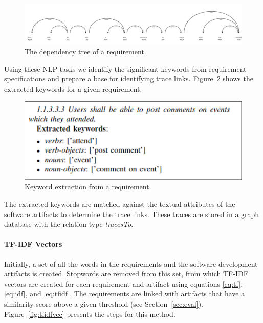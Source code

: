 \begin{figure}[htbp]
    \centering
    \includegraphics[width=1\linewidth]{figs/displacy.png}
    \caption{The dependency tree of a requirement.}
    \label{fig:deptree}
  \end{figure}

  Using these NLP tasks we identify the significant keywords from requirement specifications and prepare a base for identifying trace links. 
  Figure~\ref{fig:keywords} shows the extracted keywords for a given requirement.

  \begin{figure}[H]
    \centering
    \includegraphics[width=.96\linewidth]{figs/keywords.png}
    \caption{Keyword extraction from a requirement.}
    \label{fig:keywords}
  \end{figure}

  The extracted keywords are matched against the textual attributes of the software artifacts to determine the trace links.
  These traces are stored in a graph database with the relation type \emph{tracesTo}.

  \paragraph{TF-IDF Vectors} Initially, a set of all the words in the requirements and the software development artifacts is created. 
  Stopwords are removed from this set, from which
  TF-IDF vectors are created for each requirement and artifact using equations \ref{eq:tf}, \ref{eq:idf}, and \ref{eq:tfidf}. 
  The requirements are linked with artifacts that have a similarity score above a given threshold (see Section~\ref{sec:eval}).
  Figure~\ref{fig:tfidfvec} presents the steps for this method.


